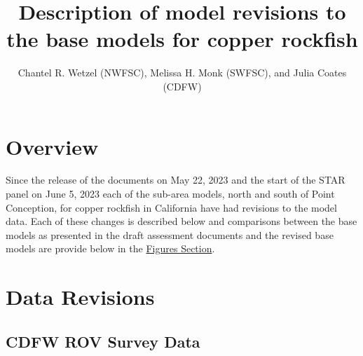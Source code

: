 \documentclass[
  letterpaper,
]{article}
\title{Description of model revisions to the base models for copper rockfish}
\author{Chantel R. Wetzel (NWFSC), Melissa H. Monk (SWFSC), and Julia Coates (CDFW)}
\date{}
\begin{document}
\maketitle

{
\setcounter{tocdepth}{2}
\tableofcontents
}
\hypertarget{overview}{%
\section{Overview}\label{overview}}

Since the release of the documents on May 22, 2023 and the start of the STAR panel on June 5, 2023 each of the sub-area models, north and south of Point Conception, for copper rockfish in California have had revisions to the model data. Each of these changes is described below and comparisons between the base models as presented in the draft assessment documents and the revised base models are provide below in the \protect\hyperlink{figures}{Figures Section}.

\hypertarget{data-revisions}{%
\section{Data Revisions}\label{data-revisions}}

\hypertarget{cdfw-rov-survey-data}{%
\subsection{CDFW ROV Survey Data}\label{cdfw-rov-survey-data}}
\end{document}
